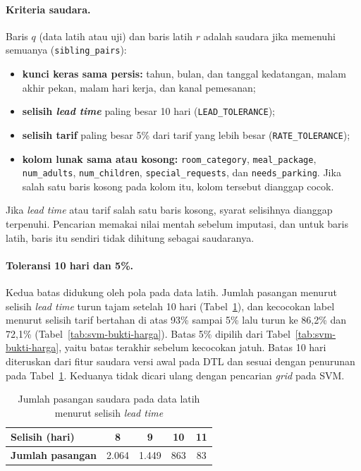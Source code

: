 \paragraph{Kriteria saudara.} Baris $q$ (data latih atau uji) dan baris latih $r$ adalah saudara jika memenuhi semuanya (\texttt{sibling\_pairs}):
\begin{itemize}
	\item \textbf{kunci keras sama persis:} tahun, bulan, dan tanggal kedatangan, malam akhir pekan, malam hari kerja, dan kanal pemesanan;
	\item \textbf{selisih \textit{lead time}} paling besar 10 hari (\texttt{LEAD\_TOLERANCE});
	\item \textbf{selisih tarif} paling besar 5\% dari tarif yang lebih besar (\texttt{RATE\_TOLERANCE});
	\item \textbf{kolom lunak sama atau kosong:} \texttt{room\_category}, \texttt{meal\_package}, \texttt{num\_adults}, \texttt{num\_children}, \texttt{special\_requests}, dan \texttt{needs\_parking}. Jika salah satu baris kosong pada kolom itu, kolom tersebut dianggap cocok.
\end{itemize}
Jika \textit{lead time} atau tarif salah satu baris kosong, syarat selisihnya dianggap terpenuhi. Pencarian memakai nilai mentah sebelum imputasi, dan untuk baris latih, baris itu sendiri tidak dihitung sebagai saudaranya.

\paragraph{Toleransi 10 hari dan 5\%.} Kedua batas didukung oleh pola pada data latih. Jumlah pasangan menurut selisih \textit{lead time} turun tajam setelah 10 hari (Tabel~\ref{tab:svm-bukti-lead}), dan kecocokan label menurut selisih tarif bertahan di atas 93\% sampai 5\% lalu turun ke 86,2\% dan 72,1\% (Tabel~\ref{tab:svm-bukti-harga}). Batas 5\% dipilih dari Tabel~\ref{tab:svm-bukti-harga}, yaitu batas terakhir sebelum kecocokan jatuh. Batas 10 hari diteruskan dari fitur saudara versi awal pada DTL dan sesuai dengan penurunan pada Tabel~\ref{tab:svm-bukti-lead}. Keduanya tidak dicari ulang dengan pencarian \textit{grid} pada SVM.

\begin{table}[H]
	\centering
	\caption{Jumlah pasangan saudara pada data latih menurut selisih \textit{lead time}}
	\label{tab:svm-bukti-lead}
	\small
	\begin{tabular}{l c c c c}
		\toprule
		\textbf{Selisih (hari)} & 8 & 9 & 10 & 11 \\
		\midrule
		\textbf{Jumlah pasangan} & 2.064 & 1.449 & 863 & 83 \\
		\bottomrule
	\end{tabular}
\end{table}

